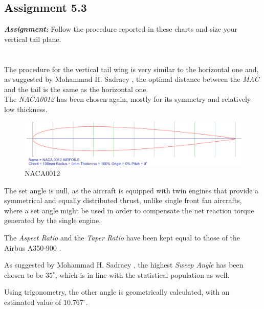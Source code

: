 \documentclass{article}
\begin{document}
\clearpage

\subsection{Assignment 5.3\label{Assignment_5.3}}

\textbf{\textit{Assignment:}} Follow the procedure reported in these charts
 and size your vertical tail plane. \\ \\ \\ 

The procedure for the vertical tail wing is very similar to the horizontal one and, as suggested by 
Mohammad H. Sadraey \autocite{Sadraey_Mohammad}, the optimal distance between the \textit{MAC} and the tail
is the same as the horizontal one.\\ 

The \textit{NACA0012} \autocite{Airfoiltools} has been chosen again, mostly for its symmetry and relatively
low thickness.\\ 

\begin{figure}[h!]
    \centering
    \includegraphics[width=\textwidth]{Sources/Plots_and_Pictures/NACA0012.png}
    \caption{NACA0012 \autocite{Airfoiltools}}
    \label{NACA0012_vert}
\end{figure}

The set angle is null, as the aircraft is equipped with twin engines that provide a symmetrical and 
equally distributed thrust, unlike single front fan aircrafts, where a set angle might be used
in order to compensate the net reaction torque generated by the single engine. 

The \textit{Aspect Ratio} and the \textit{Taper Ratio} have been kept equal to those of the Airbus A350-900 \autocite{Airbus_A350-900}.

As suggested by Mohammad H. Sadraey \autocite{Sadraey_Mohammad}, the highest \textit{Sweep Angle} has been
chosen to be $35^{\circ}$, which is in line with the statistical population as well. 

Using trigonometry, the other angle is geometrically calculated, with an estimated value of $10.767^{\circ}$. 
\clearpage 
\end{document}
